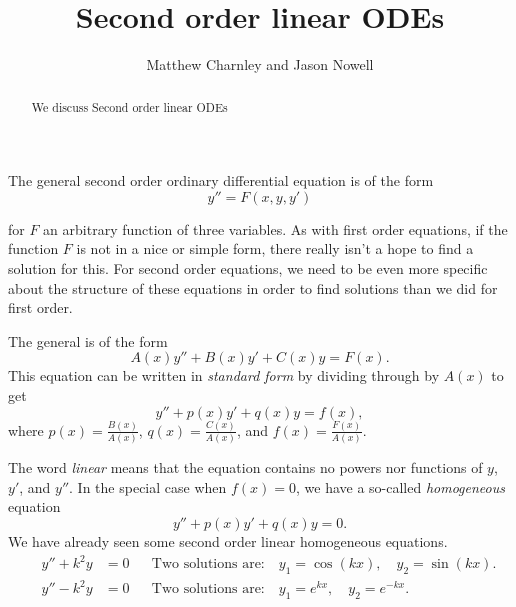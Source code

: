 \documentclass{ximera}
\title{Second order linear ODEs}
\author{Matthew Charnley and Jason Nowell}
\begin{document}
\begin{abstract}
    We discuss Second order linear ODEs
\end{abstract}
\maketitle

\label{solinear:section}



The general second order ordinary differential equation is of the form 
\begin{equation*}
    y'' = F(x, y, y')
\end{equation*} 

for $F$ an arbitrary function of three variables. As with first order equations, if the function $F$ is not in a nice or simple form, there really isn't a hope to find a solution for this. For second order equations, we need to be even more specific about the structure of these equations in order to find solutions than we did for first order.


\begin{definition}
    The general \emph{} is of the form
    \begin{equation*}
        A(x) y'' + B(x)y' + C(x)y = F(x) .
    \end{equation*}
    This equation can be written in \emph{standard form} by dividing through by $A(x)$ to get
    \begin{equation} \label{sol:eqlin}
        y'' + p(x)y' + q(x)y = f(x) ,
    \end{equation}
    where $p(x) = \frac{B(x)}{A(x)}$, $q(x) = \frac{C(x)}{A(x)}$, and $f(x) = \frac{F(x)}{A(x)}$.
\end{definition}

The word \emph{linear} means that the equation contains no powers nor functions of $y$, $y'$, and $y''$. In the special case when $f(x) = 0$, we have a so-called \emph{homogeneous} equation
\begin{equation} \label{sol:eqlinhom}
    y'' + p(x)y' + q(x)y = 0 .
\end{equation}
We have already seen some second order linear homogeneous equations.
\begin{align*}
    \qquad y'' + k^2 y & = 0 & & \text{Two solutions are:} \quad y_1 = \cos (kx), \quad y_2 = \sin(kx) . \qquad \\
    \qquad y'' - k^2 y & = 0 & & \text{Two solutions are:} \quad y_1 = e^{kx}, \quad y_2 = e^{-kx} . \qquad
\end{align*}
\end{document}
